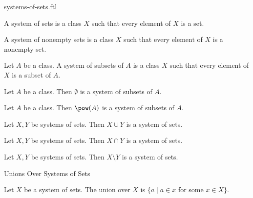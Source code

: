 \documentclass{naproche-library}
\begin{document}
\begin{smodule}[title=Systems of Sets]{systems-of-sets.ftl}

\begin{definition}[forthel,id=FOUNDATIONS_10_5805323570905088]
  A system of sets is a class $X$ such that every element of $X$ is a set.
\end{definition}

\begin{definition}[forthel,id=FOUNDATIONS_10_1631952387964928]
  A system of nonempty sets is a class $X$ such that every element of $X$ is a nonempty set.
\end{definition}

\begin{definition}[forthel,id=FOUNDATIONS_10_943381479948288]
  Let $A$ be a class.
  A system of subsets of $A$ is a class $X$ such that every element of $X$ is a subset of $A$.
\end{definition}

\begin{proposition}[forthel,id=FOUNDATIONS_10_8268633648136192]
  Let $A$ be a class.
  Then $\emptyset$ is a system of subsets of $A$.
\end{proposition}

\begin{proposition}[forthel,id=FOUNDATIONS_10_7546016869908480]
  Let $A$ be a class.
  Then $\pow(A)$ is a system of subsets of $A$.
\end{proposition}

\begin{proposition}
  Let $X, Y$ be systems of sets.
  Then $X \cup Y$ is a system of sets.
\end{proposition}

\begin{proposition}
  Let $X, Y$ be systems of sets.
  Then $X \cap Y$ is a system of sets.
\end{proposition}

\begin{proposition}
  Let $X, Y$ be systems of sets.
  Then $X \setminus Y$ is a system of sets.
\end{proposition}

\begin{sfragment}{Unions Over Systems of Sets}
  \begin{definition}[forthel,id=FOUNDATIONS_10_541772562300928]
    Let $X$ be a system of sets.
    The union over $X$ is $\{ a \mid a \in x$ for some $x \in X \}$.


\end{definition}
\end{sfragment}
\end{smodule}
\end{document}

